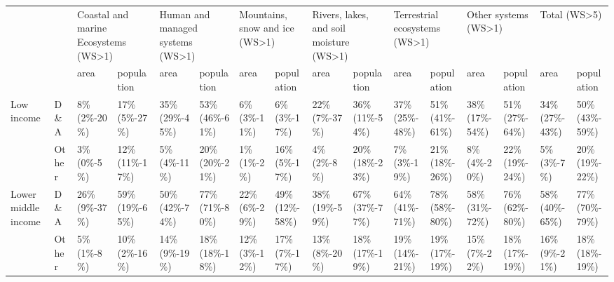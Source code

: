 \begin{tabular}{ll p{1cm} p{1cm} p{1cm} p{1cm} p{1cm} p{1cm} p{1cm} p{1cm} p{1cm} p{1cm} p{1cm} p{1cm} p{1cm} p{1cm}}
\toprule
       &       & \multicolumn{2}{L{2cm}}{Coastal and marine Ecosystems (WS>1)} & \multicolumn{2}{L{2cm}}{Human and managed systems (WS>1)} & \multicolumn{2}{L{2cm}}{Mountains, snow and ice (WS>1)} & \multicolumn{2}{L{2cm}}{Rivers, lakes, and soil moisture (WS>1)} & \multicolumn{2}{L{2cm}}{Terrestrial ecosystems (WS>1)} & \multicolumn{2}{L{2cm}}{Other systems (WS>1)} & \multicolumn{2}{L{2cm}}{Total (WS>5)} \\
       &       &                                 area &               population &                             area &               population &                           area &               population &                                    area &               population &                          area &               population &                     area &               population &                     area &               population \\
\midrule
Low income & D\&A &                8\% \mbox{(2\%-20\%)} &   17\% \mbox{(5\%-27\%)} &          35\% \mbox{(29\%-45\%)} &  53\% \mbox{(46\%-61\%)} &          6\% \mbox{(3\%-11\%)} &    6\% \mbox{(3\%-17\%)} &                  22\% \mbox{(7\%-37\%)} &  36\% \mbox{(11\%-54\%)} &       37\% \mbox{(25\%-48\%)} &  51\% \mbox{(41\%-61\%)} &  38\% \mbox{(17\%-54\%)} &  51\% \mbox{(27\%-64\%)} &  34\% \mbox{(27\%-43\%)} &  50\% \mbox{(43\%-59\%)} \\
       & Other &                 3\% \mbox{(0\%-5\%)} &  12\% \mbox{(11\%-17\%)} &            5\% \mbox{(4\%-11\%)} &  20\% \mbox{(20\%-21\%)} &           1\% \mbox{(1\%-2\%)} &   16\% \mbox{(5\%-17\%)} &                    4\% \mbox{(2\%-8\%)} &  20\% \mbox{(18\%-23\%)} &         7\% \mbox{(3\%-19\%)} &  21\% \mbox{(18\%-26\%)} &    8\% \mbox{(4\%-20\%)} &  22\% \mbox{(19\%-24\%)} &     5\% \mbox{(3\%-7\%)} &  20\% \mbox{(19\%-22\%)} \\
Lower middle income & D\&A &               26\% \mbox{(9\%-37\%)} &  59\% \mbox{(19\%-65\%)} &          50\% \mbox{(42\%-74\%)} &  77\% \mbox{(71\%-80\%)} &         22\% \mbox{(6\%-29\%)} &  49\% \mbox{(12\%-58\%)} &                 38\% \mbox{(19\%-59\%)} &  67\% \mbox{(37\%-77\%)} &       64\% \mbox{(41\%-71\%)} &  78\% \mbox{(58\%-80\%)} &  58\% \mbox{(31\%-72\%)} &  76\% \mbox{(62\%-80\%)} &  58\% \mbox{(40\%-65\%)} &  77\% \mbox{(70\%-79\%)} \\
       & Other &                 5\% \mbox{(1\%-8\%)} &   10\% \mbox{(2\%-16\%)} &           14\% \mbox{(9\%-19\%)} &  18\% \mbox{(18\%-18\%)} &         12\% \mbox{(3\%-12\%)} &   17\% \mbox{(7\%-17\%)} &                  13\% \mbox{(8\%-20\%)} &  18\% \mbox{(17\%-19\%)} &       19\% \mbox{(14\%-21\%)} &  19\% \mbox{(17\%-19\%)} &   15\% \mbox{(7\%-22\%)} &  18\% \mbox{(17\%-19\%)} &   16\% \mbox{(9\%-21\%)} &  18\% \mbox{(18\%-19\%)} \\

\end{tabular}

